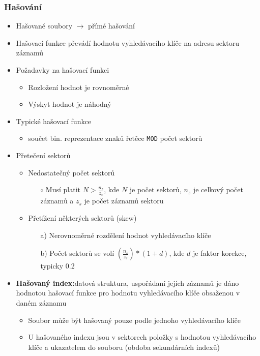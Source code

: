 \documentclass[a4paper,10pt]{article}
\newcommand{\pojem}[2]{\item \textbf{#1:}\quad #2}
\begin{document}
			\subsubsection{Hašování}
				\begin{itemize}
					\item Hašované soubory $\rightarrow$ přímé hašování
					\item Hašovací funkce převádí hodnotu vyhledávacího klíče na adresu sektoru záznamů

					\item Požadavky na hašovací funkci
					\begin{itemize}
						\item Rozložení hodnot je rovnoměrné
						\item Výskyt hodnot je náhodný
					\end{itemize}

					\item Typické hašovací funkce
					\begin{itemize}
						\item součet bin. reprezentace znaků řetěce \texttt{MOD} počet sektorů
					\end{itemize}

					\item Přetečení sektorů
					\begin{itemize}
						\item Nedostatečný počet sektorů
						\begin{itemize}
							\item[$\circ$] Musí platit $N > \frac{n_z}{z_s}$, kde $N$ je počet sektorů, $n_z$ je celkový počet záznamů a $z_s$ je počet záznamů sektoru
						\end{itemize}
						\item Přetížení některých sektorů (skew)
						\begin{itemize}
							\item[a)] Nerovnoměrné rozdělení hodnot vyhledávacího klíče
							\item[b)] Počet sektorů se volí $\left(\frac{n_z}{z_s}\right)*(1+d)$, kde $d$ je faktor korekce, typicky 0.2 
						\end{itemize}
					\end{itemize}

					\pojem{Hašovaný index}{datová struktura, uspořádaní jejích záznamů je dáno hodnotou hašovací funkce pro hodnotu vyhledávacího klíče obsaženou v daném záznamu}
					\begin{itemize}
						\item Soubor může být hašovaný pouze podle jednoho vyhledávacího klíče
						\item U hašovaného indexu jsou v sektorech položky s hodnotou vyhledávacího klíče a ukazatelem do souboru (obdoba sekundárních indexů)
					\end{itemize}


\end{itemize}
\end{document}
